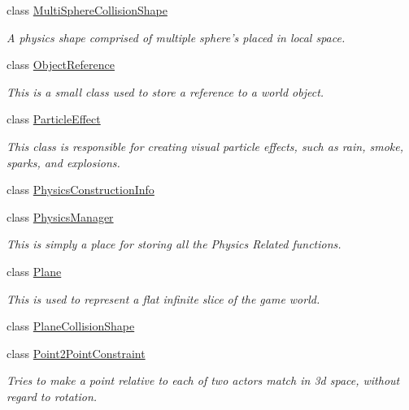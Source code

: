 \begin{DoxyCompactItemize}
class \hyperlink{classphys_1_1MultiSphereCollisionShape}{MultiSphereCollisionShape}
\begin{DoxyCompactList}\small\item\em A physics shape comprised of multiple sphere's placed in local space. \item\end{DoxyCompactList}\item 
class \hyperlink{classphys_1_1ObjectReference}{ObjectReference}
\begin{DoxyCompactList}\small\item\em This is a small class used to store a reference to a world object. \item\end{DoxyCompactList}\item 
class \hyperlink{classphys_1_1ParticleEffect}{ParticleEffect}
\begin{DoxyCompactList}\small\item\em This class is responsible for creating visual particle effects, such as rain, smoke, sparks, and explosions. \item\end{DoxyCompactList}\item 
class \hyperlink{classphys_1_1PhysicsConstructionInfo}{PhysicsConstructionInfo}
\item 
class \hyperlink{classphys_1_1PhysicsManager}{PhysicsManager}
\begin{DoxyCompactList}\small\item\em This is simply a place for storing all the Physics Related functions. \item\end{DoxyCompactList}\item 
class \hyperlink{classphys_1_1Plane}{Plane}
\begin{DoxyCompactList}\small\item\em This is used to represent a flat infinite slice of the game world. \item\end{DoxyCompactList}\item 
class \hyperlink{classphys_1_1PlaneCollisionShape}{PlaneCollisionShape}
\item 
class \hyperlink{classphys_1_1Point2PointConstraint}{Point2PointConstraint}
\begin{DoxyCompactList}\small\item\em Tries to make a point relative to each of two actors match in 3d space, without regard to rotation. \item\end{DoxyCompactList}\item 

\end{DoxyCompactItemize}
